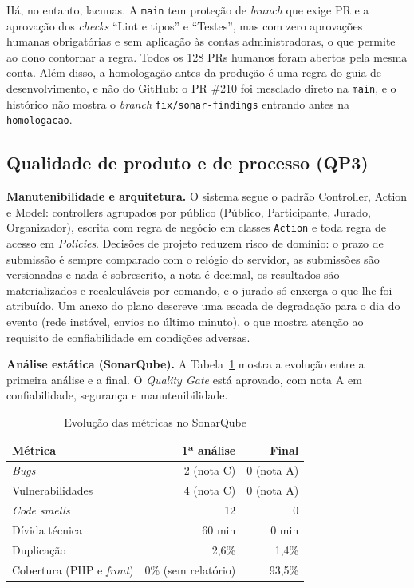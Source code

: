 Há, no entanto, lacunas. A \texttt{main} tem proteção de \textit{branch} que exige PR e a aprovação dos \textit{checks} ``Lint e tipos'' e ``Testes'', mas com zero aprovações humanas obrigatórias e sem aplicação às contas administradoras, o que permite ao dono contornar a regra. Todos os 128 PRs humanos foram abertos pela mesma conta. Além disso, a homologação antes da produção é uma regra do guia de desenvolvimento, e não do GitHub: o PR \#210 foi mesclado direto na \texttt{main}, e o histórico não mostra o \textit{branch} \texttt{fix/sonar-findings} entrando antes na \texttt{homologacao}.

\subsection{Qualidade de produto e de processo (QP3)}

\textbf{Manutenibilidade e arquitetura.} O sistema segue o padrão Controller, Action e Model: controllers agrupados por público (Público, Participante, Jurado, Organizador), escrita com regra de negócio em classes \texttt{Action} e toda regra de acesso em \textit{Policies}. Decisões de projeto reduzem risco de domínio: o prazo de submissão é sempre comparado com o relógio do servidor, as submissões são versionadas e nada é sobrescrito, a nota é decimal, os resultados são materializados e recalculáveis por comando, e o jurado só enxerga o que lhe foi atribuído. Um anexo do plano descreve uma escada de degradação para o dia do evento (rede instável, envios no último minuto), o que mostra atenção ao requisito de confiabilidade em condições adversas.

\textbf{Análise estática (SonarQube).} A Tabela~\ref{tab:sonar} mostra a evolução entre a primeira análise e a final. O \textit{Quality Gate} está aprovado, com nota A em confiabilidade, segurança e manutenibilidade.

\begin{table}[ht]
\centering
\caption{Evolução das métricas no SonarQube}
\label{tab:sonar}
\begin{tabular}{|l|r|r|}
\hline
\textbf{Métrica} & \textbf{1ª análise} & \textbf{Final} \\ \hline
\textit{Bugs} & 2 (nota C) & 0 (nota A) \\ \hline
Vulnerabilidades & 4 (nota C) & 0 (nota A) \\ \hline
\textit{Code smells} & 12 & 0 \\ \hline
Dívida técnica & 60 min & 0 min \\ \hline
Duplicação & 2,6\% & 1,4\% \\ \hline
Cobertura (PHP e \textit{front}) & 0\% (sem relatório) & 93,5\% \\ \hline
\end{tabular}
\end{table}

